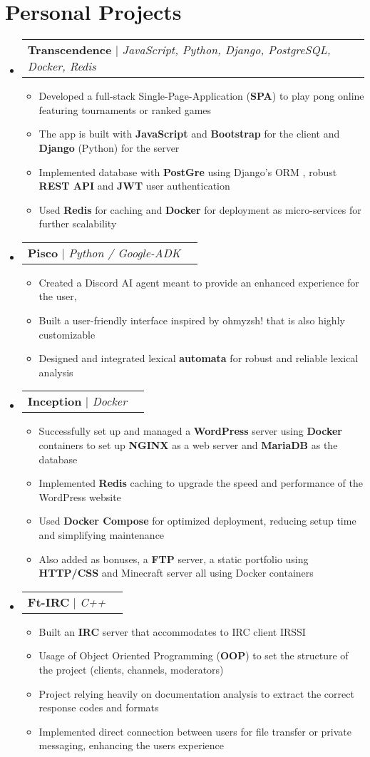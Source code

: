\documentclass[letterpaper,11pt]{article}
\makeatletter
\newcommand{\resumeItem}[1]{
  \item\small{
    {#1 \vspace{-2pt}}
  }
}
\newcommand{\resumeProjectHeading}[2]{
    \item
    \begin{tabular*}{0.97\textwidth}{l@{\extracolsep{\fill}}r}
      \small#1 & #2 \\
    \end{tabular*}\vspace{-7pt}
}
\newcommand{\resumeSubHeadingListStart}{\begin{itemize}[leftmargin=0.15in, label={}]}
\newcommand{\resumeSubHeadingListEnd}{\end{itemize}}
\newcommand{\resumeItemListStart}{\begin{itemize}}
\newcommand{\resumeItemListEnd}{\end{itemize}\vspace{-5pt}}
\makeatother
\begin{document}
\section{Personal Projects}
    \vspace{2pt}
    \resumeSubHeadingListStart
        \resumeProjectHeading
          {\textbf{Transcendence} $|$ \emph{JavaScript, Python, Django, PostgreSQL, Docker, Redis}}{}
          \resumeItemListStart
            \resumeItem{Developed a full-stack Single-Page-Application (\textbf{SPA}) to play pong online featuring tournaments or ranked games}
            \resumeItem{The app is built with \textbf{JavaScript} and \textbf{Bootstrap} for the client and \textbf{Django} (Python) for the server}
            \resumeItem{Implemented database with \textbf{PostGre} using Django's ORM , robust \textbf{REST API} and \textbf{JWT} user authentication}
            \resumeItem{Used \textbf{Redis} for caching and \textbf{Docker} for deployment as micro-services for further scalability}
          \resumeItemListEnd
        \resumeProjectHeading
          {\textbf{Pisco} $|$ \emph{Python / Google-ADK}}{}
          \resumeItemListStart
            \resumeItem{Created a Discord AI agent meant to provide an enhanced experience for the user, }
            \resumeItem{Built a user-friendly interface inspired by ohmyzsh! that is also highly customizable}
            \resumeItem{Designed and integrated lexical \textbf{automata} for robust and reliable lexical analysis}
          \resumeItemListEnd
        \resumeProjectHeading
          {\textbf{Inception} $|$ \emph{Docker}}{}
          \resumeItemListStart
            \resumeItem{Successfully set up and managed a \textbf{WordPress} server using \textbf{Docker} containers to set up \textbf{NGINX} as a web server and \textbf{MariaDB} as the database}
            \resumeItem{Implemented \textbf{Redis} caching to upgrade the speed and performance of the WordPress website}
            \resumeItem{Used \textbf{Docker Compose} for optimized deployment, reducing setup time and simplifying maintenance}
            \resumeItem{Also added as bonuses, a \textbf{FTP} server, a static portfolio using \textbf{HTTP/CSS} and Minecraft server all using Docker containers}
          \resumeItemListEnd
        \resumeProjectHeading
          {\textbf{Ft-IRC} $|$ \emph{C++}}{}
          \resumeItemListStart
            \resumeItem{Built an \textbf{IRC} server that accommodates to IRC client IRSSI}
            \resumeItem{Usage of Object Oriented Programming (\textbf{OOP}) to set the structure of the project (clients, channels, moderators)}
            \resumeItem{Project relying heavily on documentation analysis to extract the correct response codes and formats}
            \resumeItem{Implemented direct connection between users for file transfer or private messaging, enhancing the users experience}
          \resumeItemListEnd
    \resumeSubHeadingListEnd
\end{document}
